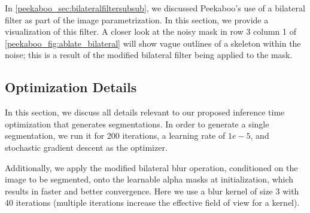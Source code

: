 In \cref{peekaboo_sec:bilateralfiltersubsub}, we discussed Peekaboo's use of a bilateral filter as part of the image parametrization. In this section, we provide a visualization of this filter.
A closer look at the noisy mask in row 3 column 1 of \cref{peekaboo_fig:ablate_bilateral} will show vague outlines of a skeleton within the noise; this is a result of the modified bilateral filter being applied to the mask.


\subsection{Optimization Details}
In this section, we discuss all details relevant to our proposed inference time optimization that generates segmentations. In order to generate a single segmentation, we run it for 200 iterations, a learning rate of $1e-5$, and stochastic gradient descent as the optimizer.

Additionally, we apply the modified bilateral blur operation, conditioned on the image to be segmented, onto the learnable alpha masks at initialization, which results in faster and better convergence. Here we use a blur kernel of size 3 with 40 iterations (multiple iterations increase the effective field of view for a kernel).


 


